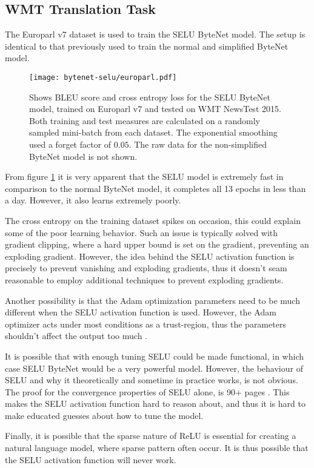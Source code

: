 \clearpage
\subsection{WMT Translation Task}

The Europarl v7 dataset is used to train the SELU ByteNet model. The setup is identical to that previously used to train the normal and simplified ByteNet model.

\begin{figure}[h]
    \centering
    \texttt{[image: bytenet-selu/europarl.pdf]}
    \caption{Shows BLEU score and cross entropy loss for the SELU ByteNet model, trained on Europarl v7 and tested on WMT NewsTest 2015. Both training and test measures are calculated on a randomly sampled mini-batch from each dataset. The exponential smoothing used a forget factor of $0.05$. The raw data for the non-simplified ByteNet model is not shown.}
    \label{fig:result:bytenet-selu:europarl}
\end{figure}

From figure \ref{fig:result:bytenet-selu:europarl} it is very apparent that the SELU model is extremely fast in comparison to the normal ByteNet model, it completes all 13 epochs in less than a day. However, it also learns extremely poorly.

The cross entropy on the training dataset spikes on occasion, this could explain some of the poor learning behavior. Such an issue is typically solved with gradient clipping, where a hard upper bound is set on the gradient, preventing an exploding gradient. However, the idea behind the SELU activation function is precisely to prevent vanishing and exploding gradients, thus it doesn't seam reasonable to employ additional techniques to prevent exploding gradients.

Another possibility is that the Adam optimization parameters need to be much different when the SELU activation function is used. However, the Adam optimizer acts under most conditions as a trust-region, thus the parameters shouldn't affect the output too much \cite{adam-optimization}.

It is possible that with enough tuning SELU could be made functional, in which case SELU ByteNet would be a very powerful model. However, the behaviour of SELU and why it theoretically and sometime in practice works, is not obvious. The proof for the convergence properties of SELU alone, is 90+ pages \cite{selu}. This makes the SELU activation function hard to reason about, and thus it is hard to make educated guesses about how to tune the model.

Finally, it is possible that the sparse nature of ReLU is essential for creating a natural language model, where sparse pattern often occur. It is thus possible that the SELU activation function will never work.